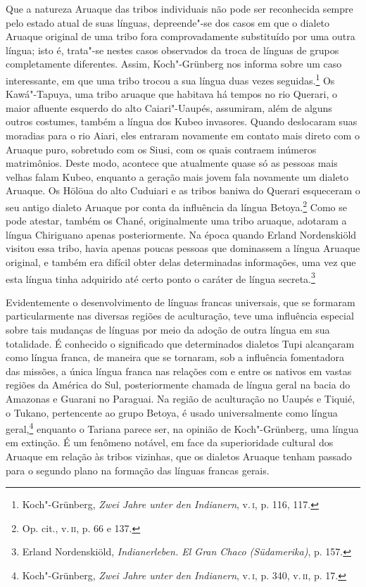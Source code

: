 Que a natureza Aruaque das tribos individuais não pode ser reconhecida
sempre pelo estado atual de suas línguas, depreende"-se dos casos em que
o dialeto Aruaque original de uma tribo fora comprovadamente substituído
por uma outra língua; isto é, trata"-se nestes casos observados da troca
de línguas de grupos completamente diferentes. Assim, Koch"-Grünberg nos
informa sobre um caso interessante, em que uma tribo trocou a sua língua
duas vezes seguidas.\footnote{Koch"-Grünberg, \emph{Zwei Jahre unter den
  Indianern}, v.\,\textsc{i}, p. 116, 117.} Os Kawá"-Tapuya, uma tribo aruaque que
habitava há tempos no rio Querari, o maior afluente esquerdo do alto
Caiari"-Uaupés, assumiram, além de alguns outros costumes, também a
língua dos Kubeo invasores. Quando deslocaram suas moradias para o rio
Aiari, eles entraram novamente em contato mais direto com o Aruaque
puro, sobretudo com os Siusi, com os quais contraem inúmeros
matrimônios. Deste modo, acontece que atualmente quase só as pessoas
mais velhas falam Kubeo, enquanto a geração mais jovem fala novamente um
dialeto Aruaque. Os Hölöua do alto Cuduiari e as tribos baniwa do
Querari esqueceram o seu antigo dialeto Aruaque por conta da influência
da língua Betoya.\footnote{Op. cit., v.\,\textsc{ii}, p. 66 e 137.} Como se pode
atestar, também os Chané, originalmente uma tribo aruaque, adotaram a
língua Chiriguano apenas posteriormente. Na época quando Erland
Nordenskiöld visitou essa tribo, havia apenas poucas pessoas que
dominassem a língua Aruaque original, e também era difícil obter delas
determinadas informações, uma vez que esta língua tinha adquirido até
certo ponto o caráter de língua secreta.\footnote{Erland Nordenskiöld,
  \emph{Indianerleben. El Gran Chaco (Südamerika)}, p. 157.}

Evidentemente o desenvolvimento de línguas francas universais, que se
formaram particularmente nas diversas regiões de aculturação, teve uma
influência especial sobre tais mudanças de línguas por meio da adoção
de outra língua em sua totalidade. É conhecido o significado que
determinados dialetos Tupi alcançaram como língua franca, de maneira que
se tornaram, sob a influência fomentadora das missões, a única língua
franca nas relações com e entre os nativos em vastas regiões da América
do Sul, posteriormente chamada de língua geral na bacia do Amazonas e
Guarani no Paraguai. Na região de aculturação no Uaupés e Tiquié, o
Tukano, pertencente ao grupo Betoya, é usado universalmente como língua
geral,\footnote{Koch"-Grünberg, \emph{Zwei Jahre unter den Indianern}, v.\,\textsc{i}, p. 340, v.\,\textsc{ii}, p. 17.} enquanto o Tariana parece ser, na opinião
de Koch"-Grünberg, uma língua em extinção. É um fenômeno notável, em face
da superioridade cultural dos Aruaque em relação às tribos vizinhas, que
os dialetos Aruaque tenham passado para o segundo plano na formação
das línguas francas gerais.

